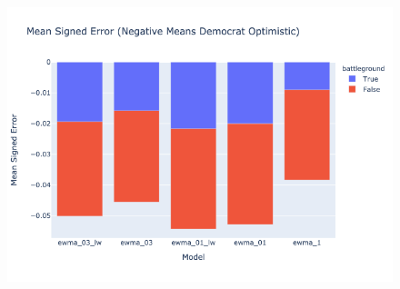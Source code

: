 

\begin{table}[H]

    \label{tab:ewma_03_lw_ewma_03_ewma_01_lw_ewma_01_ewma_1_mean_signed_error}
\end{table}

\begin{figure}
    \centering
    \includegraphics[height=26em]{figures/ewma_03_lw_ewma_03_ewma_01_lw_ewma_01_ewma_1_mean_signed_error.png}
    \label{fig:ewma_03_lw_ewma_03_ewma_01_lw_ewma_01_ewma_1_mean_signed_error}
\end{figure}

